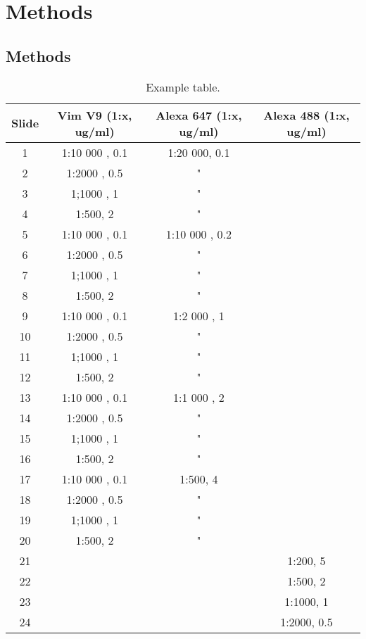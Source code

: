 \setlength{\parindent}{2em} 
\section{Methods}
\subsection{Methods}

\begin{table}[h]
	\centering
	\caption{\footnotesize Example table.}
	\label{tab:Dilutions}
	\footnotesize
	\begin{tabular}{c|ccc}
		\\
		Slide & Vim V9 (1:x, ug/ml) & Alexa 647 (1:x, ug/ml) & Alexa 488 (1:x, ug/ml) \\ \hline
		1 & 1:10 000 , 0.1 & 1:20 000, 0.1 & \\
		2 & 1:2000 , 0.5 & " & \\
		3 & 1;1000 , 1 & " & \\
		4 & 1:500, 2 & " & \\ \hline
		5 & 1:10 000 , 0.1 & 1:10 000 , 0.2 & \\
		6 & 1:2000 , 0.5 & " & \\
		7 & 1;1000 , 1 & " & \\
		8 & 1:500, 2 & " & \\ \hline
		9 & 1:10 000 , 0.1 & 1:2 000 , 1 & \\
		10 & 1:2000 , 0.5 & " & \\
		11 & 1;1000 , 1 & " & \\
		12 & 1:500, 2 & " & \\ \hline
		13 & 1:10 000 , 0.1 & 1:1 000 , 2 & \\
		14 & 1:2000 , 0.5 & " & \\
		15 & 1;1000 , 1 & " & \\
		16 & 1:500, 2 & " & \\ \hline
		17 & 1:10 000 , 0.1 & 1:500, 4 & \\
		18 & 1:2000 , 0.5 & " & \\
		19 & 1;1000 , 1 & " & \\
		20 & 1:500, 2 & " & \\ \hline
		21 & & & 1:200, 5 \\
		22 & & & 1:500, 2 \\
		23 & & & 1:1000, 1 \\
		24 & & & 1:2000, 0.5
	\end{tabular}
\end{table}
